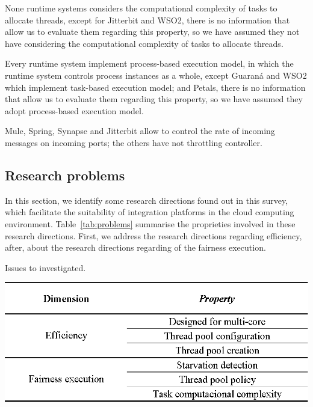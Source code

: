 None runtime systems considers the computational complexity of tasks to allocate threads, except for Jitterbit and WSO2, there is no information that allow us to evaluate them regarding this property, so we have assumed they not have considering the computational complexity of tasks to allocate threads.

Every runtime system implement process-based execution model, in which the runtime system controls process instances as a whole, except Guaraná and WSO2 which implement task-based execution model; and Petals, there is no information that allow us to evaluate them regarding this property, so we have assumed they adopt process-based execution model. 

Mule, Spring, Synapse and Jitterbit allow to control the rate of incoming messages on incoming ports; the others have not throttling controller.

\subsection{{Research problems}}
\label{subsec:problems}

\noindent

In this section, we identify some research directions found out in this survey,  which facilitate the suitability of integration platforms in the cloud computing environment. Table~\ref{tab:problems} summarise the proprieties involved in these research directions. First, we  address the research directions regarding efficiency, after, about the research directions regarding of the fairness execution.

\begin{table}[hbtp]
	\centering
	\caption{Issues to investigated.}
	\includegraphics[scale=0.9]{./figs/issues.eps}
\label{tab:problems}%
\end{table}%

